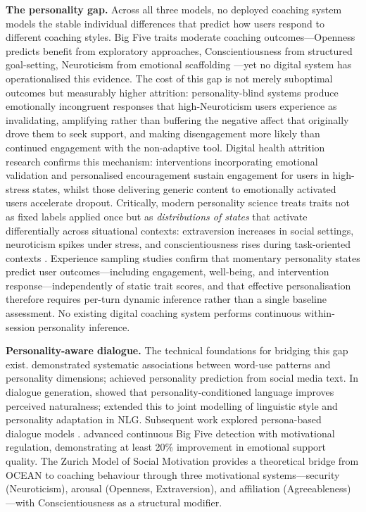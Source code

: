 \documentclass[10pt,a4paper]{report}
\begin{document}
\textbf{The personality gap.} Across all three models, no deployed coaching system models the stable individual differences that predict how users respond to different coaching styles. Big Five traits moderate coaching outcomes---Openness predicts benefit from exploratory approaches, Conscientiousness from structured goal-setting, Neuroticism from emotional scaffolding \citep{deHaan2013, Jones2016, Smither2019}---yet no digital system has operationalised this evidence. The cost of this gap is not merely suboptimal outcomes but measurably higher attrition: personality-blind systems produce emotionally incongruent responses that high-Neuroticism users experience as invalidating, amplifying rather than buffering the negative affect that originally drove them to seek support, and making disengagement more likely than continued engagement with the non-adaptive tool. Digital health attrition research confirms this mechanism: interventions incorporating emotional validation and personalised encouragement sustain engagement for users in high-stress states, whilst those delivering generic content to emotionally activated users accelerate dropout. Critically, modern personality science treats traits not as fixed labels applied once but as \emph{distributions of states} that activate differentially across situational contexts: extraversion increases in social settings, neuroticism spikes under stress, and conscientiousness rises during task-oriented contexts \citep{Fleeson2001}. Experience sampling studies confirm that momentary personality states predict user outcomes---including engagement, well-being, and intervention response---independently of static trait scores, and that effective personalisation therefore requires per-turn dynamic inference rather than a single baseline assessment. No existing digital coaching system performs continuous within-session personality inference.

\textbf{Personality-aware dialogue.} The technical foundations for bridging this gap exist. \citet{Yarkoni2010} demonstrated systematic associations between word-use patterns and personality dimensions; \citet{Park2015} achieved personality prediction from social media text. In dialogue generation, \citet{Mairesse2010} showed that personality-conditioned language improves perceived naturalness; \citet{Hu2018} extended this to joint modelling of linguistic style and personality adaptation in NLG. Subsequent work explored persona-based dialogue models \citep{Li2016, Zheng2019}. \citet{Devdas2025} advanced continuous Big Five detection with motivational regulation, demonstrating at least 20\% improvement in emotional support quality. The Zurich Model of Social Motivation \citep{Quirin2022, Quirin2023} provides a theoretical bridge from OCEAN to coaching behaviour through three motivational systems---security (Neuroticism), arousal (Openness, Extraversion), and affiliation (Agreeableness)---with Conscientiousness as a structural modifier.
\end{document}
